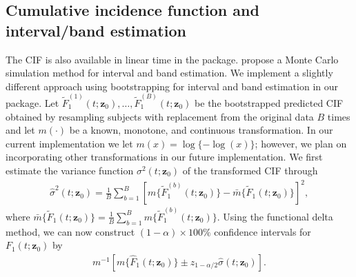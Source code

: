 \subsection{Cumulative incidence function and interval/band estimation}
The CIF is also available in linear time in the  package. \cite{fine1999proportional} propose a Monte Carlo simulation method for interval and band estimation. We implement a slightly different approach using bootstrapping for interval and band estimation in our package. Let $\tilde{F}^{(1)}_1(t; \mathbf{z}_0), \ldots, \tilde{F}^{(B)}_1(t; \mathbf{z}_0)$ be the bootstrapped predicted CIF obtained by resampling subjects with replacement from the original data $B$ times and let $m(\cdot)$ be a known, monotone, and continuous transformation. In our current implementation we let $m(x) = \log\{-\log(x)\}$; however, we plan on incorporating other transformations in our future implementation. We first estimate the variance function $\sigma^2(t; \mathbf{z}_0)$ of the transformed CIF through
\begin{align}
\label{eq3:boot_var_est}
\hat{\sigma}^2(t; \mathbf{z}_0) = \frac{1}{B} \sum_{b=1}^B \left[ m\{\tilde{F}^{(b)}_1(t; \mathbf{z}_0)\} - \bar{m}\{\tilde{F}_1(t; \mathbf{z}_0)\} \right]^2,
\end{align}
where $\bar{m}\{\tilde{F}_1(t; \mathbf{z}_0)\}  = \frac{1}{B} \sum_{b=1}^B m\{\tilde{F}^{(b)}_1(t; \mathbf{z}_0)\}$. Using the functional delta method, we can now construct $(1 - \alpha) \times 100\%$ confidence intervals for $F_1(t; \mathbf{z}_0)$ by 
\begin{align}
\label{eq3:boot_cif_int}
m^{-1} \left[ m\{\hat{F}_1(t; \mathbf{z}_0)\} \pm z_{1 - \alpha / 2} \hat{\sigma}(t; \mathbf{z}_0)\right].
\end{align}

